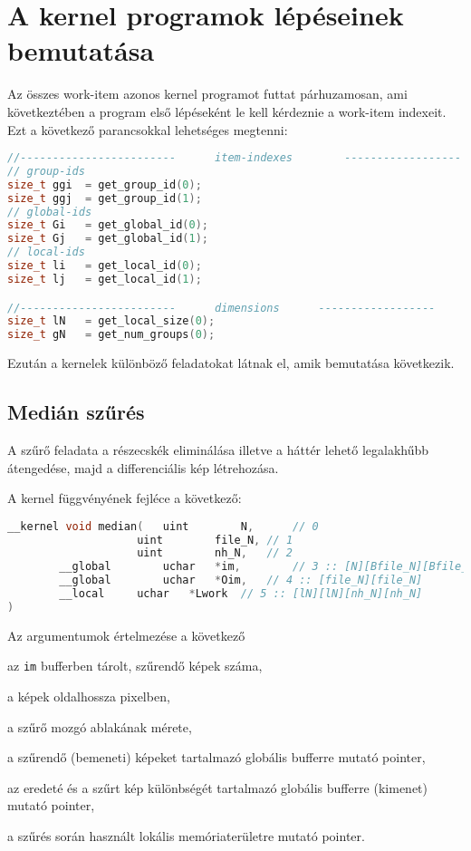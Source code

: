 \chapter{A kernel programok lépéseinek bemutatása}
Az összes work-item azonos kernel programot futtat párhuzamosan, ami következtében a program első lépéseként le kell kérdeznie a
work-item indexeit. Ezt a következő parancsokkal lehetséges megtenni:
\begin{lstlisting}[language=C++]
//------------------------		item-indexes		------------------
// group-ids
size_t ggi	= get_group_id(0);
size_t ggj	= get_group_id(1);
// global-ids
size_t Gi	= get_global_id(0);
size_t Gj	= get_global_id(1);
// local-ids
size_t li	= get_local_id(0);
size_t lj	= get_local_id(1);

//------------------------		dimensions		------------------
size_t lN	= get_local_size(0);
size_t gN	= get_num_groups(0);
\end{lstlisting}

\noindent Ezután a kernelek különböző feladatokat látnak el, amik bemutatása következik. 
\section{Medián szűrés}
	A szűrő feladata a részecskék eliminálása illetve a háttér lehető legalakhűbb átengedése, majd a differenciális kép létrehozása.
	
\noindent A kernel függvényének fejléce a következő:
\begin{lstlisting}[language=C++]
__kernel void median(	uint		N,		// 0
					uint		file_N,	// 1
					uint		nh_N,	// 2
		__global		uchar	*im,		// 3 :: [N][Bfile_N][Bfile_N]					
		__global		uchar	*Oim,	// 4 :: [file_N][file_N]
		__local		uchar	*Lwork	// 5 :: [lN][lN][nh_N][nh_N]
)
\end{lstlisting}

\noindent Az argumentumok értelmezése a következő
	\begin{description}[noitemsep]
		\item[\texttt{N}] az \texttt{im} bufferben tárolt, szűrendő képek száma,
		\item[\texttt{file\_N}] a képek oldalhossza pixelben,
		\item[\texttt{nh\_N}] a szűrő mozgó ablakának mérete,
		\item[\texttt{im}] a szűrendő (bemeneti) képeket tartalmazó globális bufferre mutató pointer,
		\item[\texttt{Oim}] az eredeté és a szűrt kép különbségét tartalmazó globális bufferre (kimenet) mutató pointer,
		\item[\texttt{Lwork}] a szűrés során használt lokális memóriaterületre mutató pointer.
	\end{description}
	
